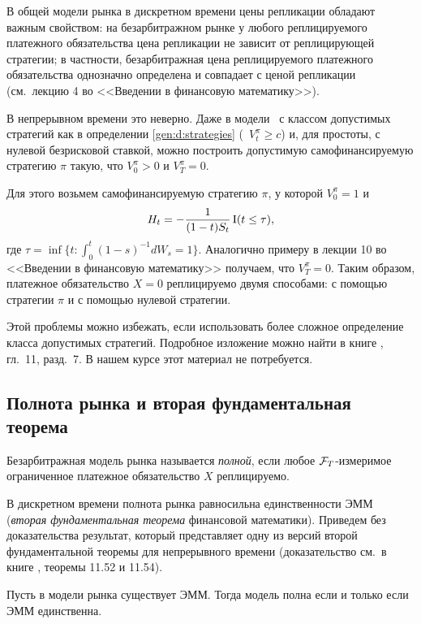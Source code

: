 \begin{remark}
\label{gen:r:replication}
В общей модели рынка в дискретном времени цены репликации обладают важным свойством: на безарбитражном рынке у любого реплицируемого платежного обязательства цена репликации не зависит от реплицирующей стратегии; в частности, безарбитражная цена реплицируемого платежного обязательства однозначно определена и совпадает с ценой репликации (см.~лекцию 4 во <<Введении в финансовую математику>>).

В непрерывном времени это неверно.
Даже в модели \bs\ с классом допустимых стратегий как в определении \ref{gen:d:strategies} (\te\ $V_t^\pi\ge c$) и, для простоты, с нулевой безрисковой ставкой, можно построить допустимую самофинансируемую стратегию $\pi$ такую, что $V_0^\pi > 0$ и $V_T^\pi = 0$.

Для этого возьмем самофинансируемую стратегию $\pi$, у которой $V_0^\pi = 1$ и
\[
H_t = -\frac{1}{(1-t)S_t} \operatorname{I}(t\le\tau),
\]
где $\tau = \inf\{t: \int_0^t (1-s)^{-1} d W_s = 1\}$. 
Аналогично примеру в лекции 10 во <<Введении в финансовую математику>> получаем, что $V_T^\pi=0$.
Таким образом, платежное обязательство $X=0$ реплицируемо двумя способами: с помощью стратегии $\pi$ и с помощью нулевой стратегии.

Этой проблемы можно избежать, если использовать более сложное определение класса допустимых стратегий.
Подробное изложение можно найти в книге \cite{EberleinKallsen19}, гл.~11, разд.~7.
В нашем курсе этот материал не потребуется.
\end{remark}


\subsection{Полнота рынка и вторая фундаментальная теорема}

\begin{definition}
Безарбитражная модель рынка называется \emph{полной}, если любое $\mathcal{F}_T$-измеримое ограниченное платежное обязательство $X$ реплицируемо.
\end{definition}

В дискретном времени полнота рынка равносильна единственности ЭММ (\emph{вторая фундаментальная теорема} финансовой математики).
Приведем без доказательства результат, который представляет одну из версий второй фундаментальной теоремы для непрерывного времени (доказательство см.~в книге \cite{EberleinKallsen19}, теоремы 11.52 и 11.54).

\begin{theorem}
Пусть в модели рынка существует ЭММ.
Тогда модель полна если и только если ЭММ единственна.
\end{theorem}

